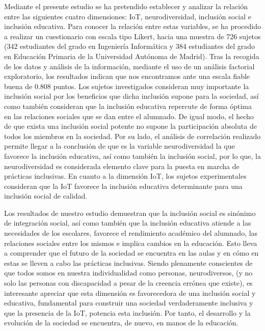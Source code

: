 \documentclass[spanish]{textolivre}
\begin{document}
Mediante el presente estudio se ha pretendido establecer y analizar la relación entre las siguientes cuatro dimensiones: IoT, neurodiversidad, inclusión social e inclusión educativa. Para conocer la relación entre estas variables, se ha procedido a realizar un cuestionario con escala tipo Likert, hacia una muestra de 726 sujetos (342 estudiantes del grado en Ingeniería Informática y 384 estudiantes del grado en Educación Primaria de la Universidad Autónoma de Madrid). Tras la recogida de los datos y análisis de la información, mediante el uso de un análisis factorial exploratorio, los resultados indican que nos encontramos ante una escala fiable buena de 0.808 puntos. Los sujetos investigados consideran muy importante la inclusión social por los beneficios que dicha inclusión supone para la sociedad, así como también consideran que la inclusión educativa repercute de forma óptima en las relaciones sociales que se dan entre el alumnado. De igual modo, el hecho de que exista una inclusión social potente no supone la participación absoluta de todos los miembros en la sociedad. Por su lado, el análisis de correlación realizado permite llegar a la conclusión de que es la variable neurodiversidad la que favorece la inclusión educativa, así como también la inclusión social, por lo que, la neurodiversidad es considerada elemento clave para la puesta en marcha de prácticas inclusivas. En cuanto a la dimensión IoT, los sujetos experimentales consideran que la IoT favorece la inclusión educativa determinante para una inclusión social de calidad.

Los resultados de nuestro estudio demuestran que la inclusión social es sinónimo de integración social, así como también que la inclusión educativa atiende a las necesidades de los escolares, favorece el rendimiento académico del alumnado, las relaciones sociales entre los mismos e implica cambios en la educación. Esto lleva a comprender que el futuro de la sociedad se encuentra en las aulas y en cómo en estas se lleven a cabo las prácticas inclusivas. Siendo plenamente conscientes de que todos somos en nuestra individualidad como personas, neurodiversos, (y no solo las personas con discapacidad a pesar de la creencia errónea que existe), es interesante apreciar que esta dimensión es favorecedora de una inclusión social y educativa, fundamental para construir una sociedad verdaderamente inclusiva y que la presencia de la IoT, potencia esta inclusión. Por tanto, el desarrollo y la evolución de la sociedad se encuentra, de nuevo, en manos de la educación.
\end{document}
